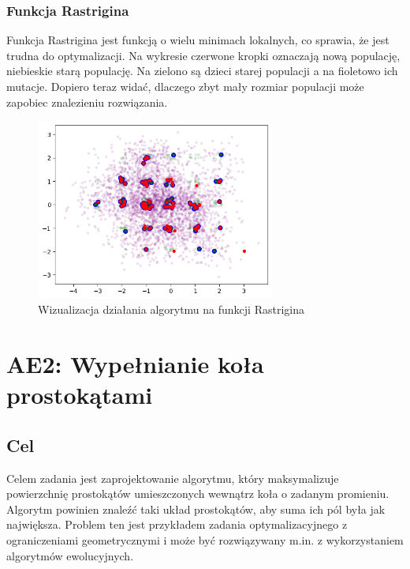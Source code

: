 \documentclass{article}
\begin{document}
\subsubsection*{Funkcja Rastrigina}
Funkcja Rastrigina jest funkcją o wielu minimach lokalnych, co sprawia, że jest trudna do optymalizacji. Na wykresie czerwone kropki oznaczają nową populację, niebieskie starą populację. Na zielono są dzieci starej populacji a na fioletowo ich mutacje. Dopiero teraz widać, dlaczego zbyt mały rozmiar populacji może zapobiec znalezieniu rozwiązania.
\begin{figure}[H]
    \centering
    \includegraphics[width=0.7\textwidth]{img/ae1/rastrigin_distribution.png}
    \caption{Wizualizacja działania algorytmu na funkcji Rastrigina}
\end{figure}

\newpage

\section*{AE2: Wypełnianie koła prostokątami}
\subsection*{Cel}
Celem zadania jest zaprojektowanie algorytmu, który maksymalizuje powierzchnię prostokątów umieszczonych wewnątrz koła o zadanym promieniu.  Algorytm powinien znaleźć taki układ prostokątów, aby suma ich pól była jak największa. Problem ten jest przykładem zadania optymalizacyjnego z ograniczeniami geometrycznymi i może być rozwiązywany m.in. z wykorzystaniem algorytmów ewolucyjnych.
\end{document}

